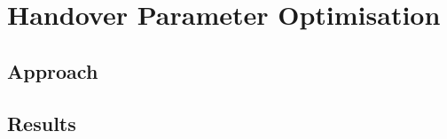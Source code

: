\chapter{Handover Parameter Optimisation}\label{handover parameter optimisation}
\section{Approach}\label{approach}
\section{Results}\label{results}